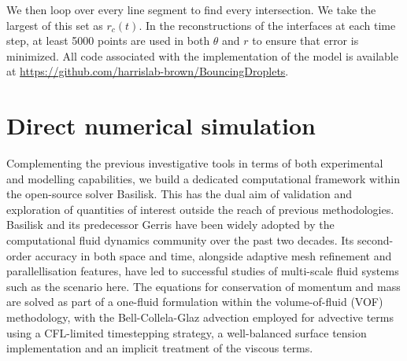 \documentclass{jfm}
\begin{document}
We then loop over every line segment to find every intersection. We take the largest of this set as $r_c(t)$. In the reconstructions of the interfaces at each time step, at least 5000 points are used in both $\theta$ and $r$ to ensure that error is minimized.  All code associated with the implementation of the model is  available at  \url{https://github.com/harrislab-brown/BouncingDroplets}.
\section{Direct numerical simulation}\label{sec.ModellingAndSimulations}
 
Complementing the previous investigative tools in terms of both experimental and modelling capabilities, we build a dedicated computational framework within the open-source solver Basilisk. This has the dual aim of validation and exploration of quantities of interest outside the reach of previous methodologies. Basilisk \citep{popinet2015quadtree} and its predecessor Gerris \citep{popinet2003gerris, popinet2009accurate} have been widely adopted by the computational fluid dynamics community over the past two decades. Its second-order accuracy in both space and time, alongside adaptive mesh refinement and parallellisation features, have led to successful studies of multi-scale fluid systems such as the scenario here. The equations for conservation of momentum and mass are solved as part of a one-fluid formulation within the volume-of-fluid (VOF) methodology, with the Bell-Collela-Glaz advection \citep{bell1989second} employed for advective terms using a CFL-limited timestepping strategy, a well-balanced surface tension implementation \citep{popinet2018numerical} and an implicit treatment of the viscous terms.
\end{document}
